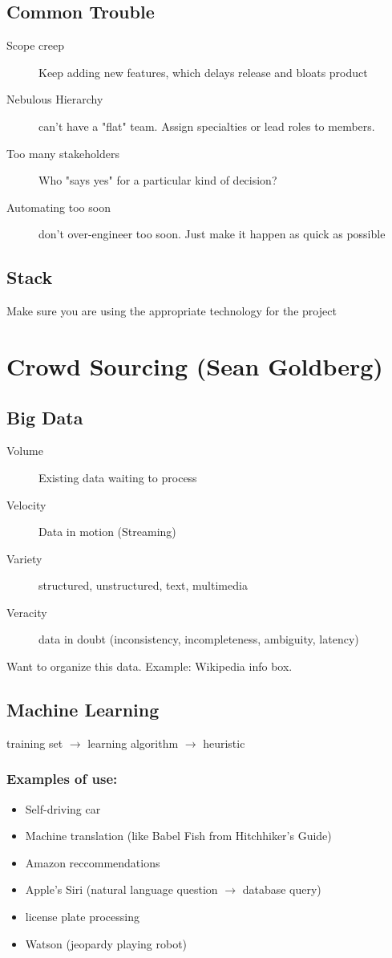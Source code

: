 \documentclass[12pt]{article}
\begin{document}
\subsection{Common Trouble}
\begin{description}
  \item[Scope creep] Keep adding new features, which delays release and bloats
    product
  \item[Nebulous Hierarchy] can't have a "flat" team. Assign specialties or
    lead roles to members.
  \item[Too many stakeholders] Who "says yes" for a particular kind of decision?
  \item[Automating too soon] don't over-engineer too soon. Just make it happen
    as quick as possible
\end{description}

\subsection{Stack}
Make sure you are using the appropriate technology for the project

\section{Crowd Sourcing (Sean Goldberg)}
\subsection{Big Data}
\begin{description}
  \item[Volume] Existing data waiting to process
  \item[Velocity] Data in motion (Streaming)
  \item[Variety] structured, unstructured, text, multimedia
  \item[Veracity] data in doubt (inconsistency, incompleteness, ambiguity,
    latency)
\end{description}
Want to organize this data. Example: Wikipedia info box.

\subsection{Machine Learning}
training set $\rightarrow$ learning algorithm $\rightarrow$ heuristic

\subsubsection{Examples of use:}
\begin{itemize}
  \item Self-driving car
  \item Machine translation (like Babel Fish from Hitchhiker's Guide)
  \item Amazon reccommendations
  \item Apple's Siri (natural language question $\rightarrow$ database query)
  \item license plate processing
  \item Watson (jeopardy playing robot)
\end{itemize}
\end{document}
